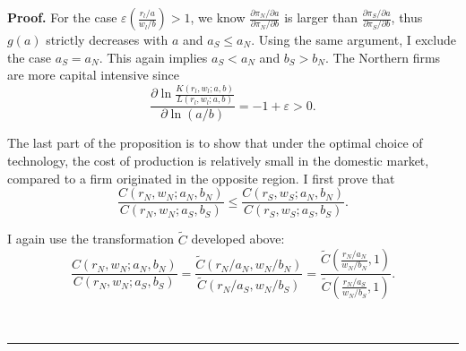 \documentclass[notitlepage,11pt]{article}%
\newenvironment{proof}[1][Proof]{\noindent \textbf{#1.} }{\  \rule{0.5em}{0.5em}}
\begin{document}
\begin{proof}
For the case $\varepsilon\left(  \frac{r_{l}/a}{w_{l}/b}\right)  >1$, we know
$\frac{\partial\pi_{N}/\partial a}{\partial\pi_{N}/\partial b}$ is larger than
$\frac{\partial\pi_{S}/\partial a}{\partial\pi_{S}/\partial b}$, thus
$g\left(  a\right)  $ strictly decreases with $a$ and $a_{S}\leq a_{N}$. Using
the same argument, I exclude the case $a_{S}=a_{N}$. This again implies
$a_{S}<a_{N}$ and $b_{S}>b_{N}$. The Northern firms are more capital intensive
since%
\[
\frac{\partial\ln\frac{K\left(  r_{l},w_{l};a,b\right)  }{L\left(  r_{l}%
,w_{l};a,b\right)  }}{\partial\ln\left(  a/b\right)  }=-1+\varepsilon
>0\text{.}%
\]


The last part of the proposition is to show that under the optimal choice of
technology, the cost of production is relatively small in the domestic market,
compared to a firm originated in the opposite region. I first prove that%
\begin{equation}
\frac{C\left(  r_{N},w_{N};a_{N},b_{N}\right)  }{C\left(  r_{N},w_{N}%
;a_{S},b_{S}\right)  }\leq\frac{C\left(  r_{S},w_{S};a_{N},b_{N}\right)
}{C\left(  r_{S},w_{S};a_{S},b_{S}\right)  }. \label{relativeCosts}%
\end{equation}


I again use the transformation $\tilde{C}$ developed above:%
\[
\frac{C\left(  r_{N},w_{N};a_{N},b_{N}\right)  }{C\left(  r_{N},w_{N}%
;a_{S},b_{S}\right)  }=\frac{\tilde{C}\left(  r_{N}/a_{N},w_{N}/b_{N}\right)
}{\tilde{C}\left(  r_{N}/a_{S},w_{N}/b_{S}\right)  }=\frac{\tilde{C}\left(
\frac{r_{N}/a_{N}}{w_{N}/b_{N}},1\right)  }{\tilde{C}\left(  \frac{r_{N}%
/a_{S}}{w_{N}/b_{S}},1\right)  }.
\]



\end{proof}
\end{document}
